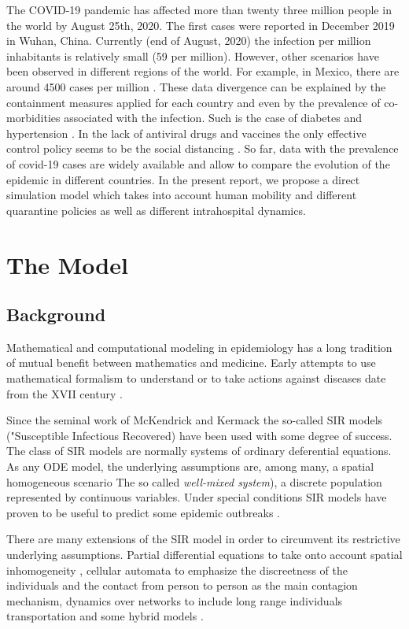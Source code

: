 \documentclass[11pt,a4paper,reqno]{amsart}
\theoremstyle{definition}
\theoremstyle{remark}
\begin{document}
The COVID-19 pandemic has affected more than twenty three million people in the world by August 25th, 2020. The first cases were reported in December 2019 in Wuhan, China. Currently (end of August, 2020) the infection per million inhabitants is relatively small (59 per million). However, other scenarios have been observed in different regions of the world. For example, in Mexico, there are  around 4500 cases per million \cite{WHO}. These data divergence can be explained by the containment measures applied for each country and even by the prevalence of co-morbidities associated with the infection. Such is the case of diabetes and hypertension \cite{MuniyappaR2020}. In the lack of antiviral drugs and vaccines the only effective control policy seems to be the social distancing \cite{DerekKChu2020}. So far, data with the prevalence of covid-19 cases are widely available and allow to compare the evolution of the epidemic in different countries. In the present report, we propose a direct simulation model which takes into account human mobility and different quarantine policies as well as different intrahospital dynamics.

\bigskip
\section{The Model}

\subsection{Background} Mathematical and computational modeling in epidemiology has a long tradition of mutual benefit between mathematics and medicine. Early attempts to use mathematical formalism to understand or to take actions against diseases date from the XVII century \cite{Hethcote2000}.

Since the seminal work of McKendrick and Kermack the so-called SIR models ("Susceptible Infectious Recovered) have been used with some degree of success. The class of SIR models are normally systems of ordinary deferential equations. As any ODE model, the underlying assumptions are, among many, a spatial homogeneous scenario The so called {\it well-mixed system}), a discrete population represented by continuous variables. Under special conditions SIR models have proven to be useful to predict some epidemic outbreaks \cite{Hethcote2000}.

There are many extensions of the SIR model in order to circumvent its restrictive underlying assumptions. Partial differential equations to take onto account spatial inhomogeneity \cite{Britton2020}, cellular automata to emphasize the discreetness of the individuals and the contact from person to person as the main contagion mechanism, dynamics over networks to include long range individuals transportation and some hybrid models \cite{Britton2020}.
\end{document}
